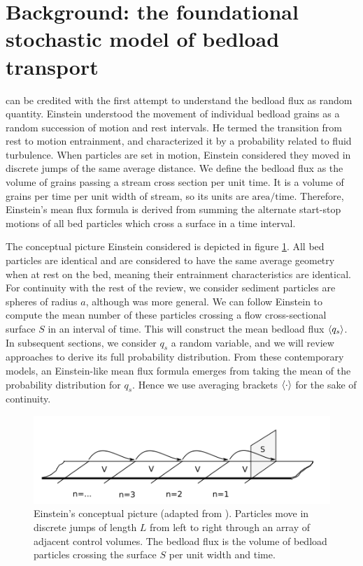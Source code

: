 \section{Background: the foundational stochastic model of bedload transport} 
\label{sec:background}

\citet{Einstein1950} can be credited with the first attempt to understand the bedload flux as random quantity.  
Einstein understood the movement of individual bedload grains as a random succession of motion and rest intervals.
He termed the transition from rest to motion entrainment, and characterized it by a probability related to fluid turbulence. 
When particles are set in motion, Einstein considered they moved in discrete jumps of the same average distance. 
We define the bedload flux as the volume of grains passing a stream cross section per unit time.
It is a volume of grains per time per unit width of stream, so its units are $\text{area}/\text{time}$.  
Therefore, Einstein's mean flux formula is derived from summing the alternate start-stop motions of all bed particles which cross a surface in a time interval. 

The conceptual picture Einstein considered is depicted in figure \ref{fig:yalin}. 
All bed particles are identical and are considered to have the same average geometry when at rest on the bed, meaning their entrainment characteristics are identical. 
For continuity with the rest of the review, we consider sediment particles are spheres of radius $a$, although \citet{Einstein1950} was more general. 
We can follow Einstein to compute the mean number of these particles crossing a flow cross-sectional surface $S$ in an interval of time. 
This will construct the mean bedload flux $\langle q_s \rangle$.
In subsequent sections, we consider $q_s$ a random variable, and we will review approaches to derive its full probability distribution.
From these contemporary models, an Einstein-like mean flux formula emerges from taking the mean of the probability distribution for $q_s$.  
Hence we use averaging brackets $\langle \cdot \rangle$ for the sake of continuity. 

\begin{figure}
	\centering
	\includegraphics[width=.98\linewidth]{./figures/ch1/yalindrawing.png}
	\caption{Einstein's conceptual picture (adapted from \citet{Yalin1972}). Particles move in discrete jumps of length $L$ from left to right through an array of adjacent control volumes. The bedload flux is the volume of bedload particles crossing the surface $S$ per unit width and time. \label{fig:yalin}}
\end{figure}

